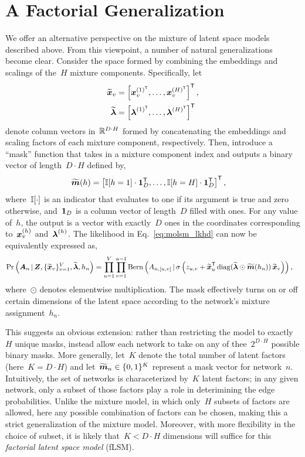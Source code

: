 \section{A Factorial Generalization}
We offer an alternative perspective on the mixture of latent
space models described above.  From this viewpoint, a number
of natural generalizations become clear. Consider the space
formed by combining the embeddings and scalings of the~$H$
mixture components.  Specifically, let
\begin{align}
  \widetilde{\boldsymbol{x}}_v &= \left[\boldsymbol{x}_v^{(1)^{\mathsf{T}}}, \ldots, \boldsymbol{x}_v^{(H)^{\mathsf{T}}}\right]^{\mathsf{T}}, \\
  \widetilde{\boldsymbol{\lambda}} &= \left[\boldsymbol{\lambda}^{(1)^{\mathsf{T}}}, \ldots, \boldsymbol{\lambda}^{(H)^{\mathsf{T}}} \right]^{\mathsf{T}}
\end{align}
denote column vectors in~$\mathbb{R}^{D \cdot H}$ formed by concatenating the
embeddings and scaling factors of each mixture component, respectively.
Then, introduce a ``mask'' function that takes in a mixture component index and
outputs a binary vector of length~$D \cdot H$ defined by,
\begin{align}
  \widetilde{\boldsymbol{m}}(h) &= \left[ \mathbb{I}[h=1] \cdot \boldsymbol{1}_D^{\mathsf{T}}, \ldots, \mathbb{I}[h=H] \cdot \boldsymbol{1}_D^{\mathsf{T}} \right]^{\mathsf{T}},
\end{align}
where~$\mathbb{I}[\cdot]$ is an indicator that evaluates to one if its
argument is true and zero otherwise, and~$\boldsymbol{1}_D$ is a column vector
of length~$D$ filled with ones. For any value of~$h$, the output is a
vector with exactly~$D$ ones in the coordinates corresponding
to~$\boldsymbol{x}_v^{(h)}$ and~$\boldsymbol{\lambda}^{(h)}$. The likelihood in Eq.~\eqref{eq:molsm_lkhd} can now
be equivalently expressed as,
\begin{align}
  \Pr \left(\boldsymbol{A}_n \, | \,
  \boldsymbol{Z}, \{\widetilde{\boldsymbol{x}}_v\}_{v=1}^V,
  \widetilde{\boldsymbol{\lambda}}, h_n \right) 
  &= \prod_{u=1}^V \prod_{v=1}^{u-1}
  \mathrm{Bern} \left(A_{n,[u,v]} \, | \,
    \sigma \left(z_{u,v} + \widetilde{\boldsymbol{x}}_{u}^{\mathsf{T}}
    \operatorname{diag}(\widetilde{\boldsymbol{\lambda}} \odot \widetilde{\boldsymbol{m}}(h_n)) \,
    \widetilde{\boldsymbol{x}}_v \right) \right),
\end{align}
where~$\odot$ denotes elementwise multiplication. The mask effectively
turns on or off certain dimensions of the latent space according to
the network's mixture assignment~$h_n$.

This suggests an obvious extension: rather than restricting the model
to exactly~$H$ unique masks, instead allow each network to take on any
of thee~$2^{D \cdot H}$ possible binary masks. More generally, let~$K$
denote the total number of latent factors (here~${K=D \cdot H}$) and
let~${\widetilde{\boldsymbol{m}}_n \in \{0,1\}^K}$ represent a mask vector
for network~$n$. Intuitively, the set of networks is
characeterized by~$K$ latent factors; in any given network, only a
subset of those factors play a role in deterimining the edge
probabilities. Unlike the mixture model, in which only~$H$ subsets of
factors are allowed, here any possible combination of factors can be
chosen, making this a strict generalization of the mixture model.
Moreover, with more flexibility in the choice of subset, it
is likely that~${K < D \cdot H}$ dimensions will suffice for this
\emph{factorial latent space model} (fLSM).


